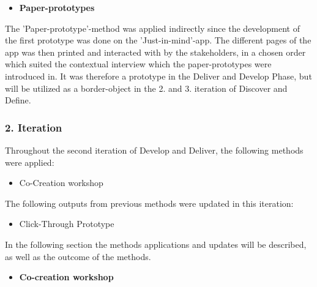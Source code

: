 \begin{itemize}
    \item \bf{Paper-prototypes}
\end{itemize}

The 'Paper-prototype'-method was applied indirectly since the development of the first prototype was done on the 'Just-in-mind'-app. The different pages of the app was then printed and interacted with by the stakeholders, in a chosen order which suited the contextual interview which the paper-prototypes were introduced in. It was therefore a prototype in the Deliver and Develop Phase, but will be utilized as a border-object in the 2. and 3. iteration of Discover and Define.

\subsubsection{2. Iteration}

Throughout the second iteration of Develop and Deliver, the following methods were applied:

\begin{itemize}
    \item Co-Creation workshop
\end{itemize}

The following outputs from previous methods were updated in this iteration:

\begin{itemize}
    \item Click-Through Prototype
\end{itemize}

In the following section the methods applications and updates will be described, as well as the outcome of the methods.

\begin{itemize}
    \item \bf{Co-creation workshop}
\end{itemize}

